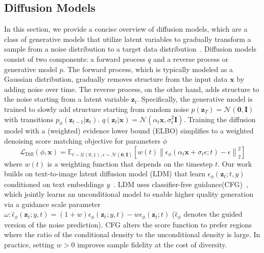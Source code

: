 \documentclass{article}
\begin{document}
\subsection{Diffusion Models}

In this section, we provide a concise overview of diffusion models, which are a class of generative models that utilize latent variables to gradually transform a sample from a noise distribution to a target data distribution~\cite{diffusion_models_dickstein_2015,ddpm_ho_2020}.
Diffusion models consist of two components: a forward process $q$ and a reverse process or generative model $p$. The forward process, which is typically modeled as a Gaussian distribution, gradually removes structure from the input data $\bm{x}$ by adding noise over time. The reverse process, on the other hand, adds structure to the noise starting from a latent variable $\bm{z}_t$.
Specifically, the generative model is trained to slowly add structure starting from random noise $p(\bm{z}_T) = \mathcal{N}(\bm{0}, \bm{I})$ with transitions $p_{\phi}(\bm{z}_{t-1}|\bm{z}_{t})$.
$q(\bm{z}_t | \bm{x}) = \mathcal{N}(\alpha_t \bm{x}, \sigma^2_t \bm{I})$.
Training the diffusion model with a (weighted) evidence lower bound (ELBO) simplifies to a weighted denoising score matching objective for parameters $\phi$~\cite{ddpm_ho_2020}
\begin{equation}
\mathcal{L}_{\mathrm{Diff}}(\phi, \bm{x})=\mathbb{E}_{t \sim \mathcal{U}(0,1), \epsilon \sim \mathcal{N}(\bm{0}, \bm{I})}
\left[
w(t)\left\|\epsilon_{\phi}\left(\alpha_{t} \bm{x}+\sigma_{t} \epsilon ; t\right)-\epsilon\right\|_{2}^{2}
\right]
\end{equation}
where $w(t)$ is a weighting function that depends on the timestep $t$.
Our work builds on text-to-image latent diffusion model (LDM) that learn $\epsilon_{\phi}(\bm{z}_t;t,y)$ conditioned on text embeddings $y$~\cite{ldm_2022_Rombach}.
LDM uses classifier-free guidance(CFG)~\cite{classifierfree_2022_ho}, which jointly learns an unconditional model to enable higher quality generation via a guidance scale parameter $\omega: \hat{\epsilon}_{\phi} (\bm{z}_t;y,t) = (1+w) \epsilon_{\phi}(\bm{z}_t;y,t) - w\epsilon_{\phi}(\bm{z}_t;t)$ ($\hat{\epsilon}_{\phi}$ denotes the guided version of the noise prediction). CFG alters the score function to prefer regions where the ratio of the conditional density to the unconditional density is large. In practice, setting $w > 0$ improves sample fidelity at the cost of diversity.
\end{document}
